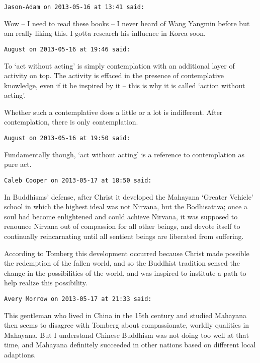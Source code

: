\begin{footnotesize}\begin{sffamily}

\texttt{Jason-Adam on 2013-05-16 at 13:41 said: }

Wow – I need to read these books – I never heard of Wang Yangmin before but am really liking this. I gotta research his influence in Korea soon.

\hfill

\texttt{August on 2013-05-16 at 19:46 said: }

To `act without acting’ is simply contemplation with an additional layer of activity on top. The activity is effaced in the presence of contemplative knowledge, even if it be inspired by it – this is why it is called `action without acting’.

Whether such a contemplative does a little or a lot is indifferent. After contemplation, there is only contemplation.


\hfill

\texttt{August on 2013-05-16 at 19:50 said: }

Fundamentally though, `act without acting’ is a reference to contemplation as pure act.


\hfill

\texttt{Caleb Cooper on 2013-05-17 at 18:50 said: }

In Buddhisms' defense, after Christ it developed the Mahayana `Greater Vehicle' school in which the highest ideal was not Nirvana, but the Bodhisattva; once a soul had become enlightened and could achieve Nirvana, it was supposed to renounce Nirvana out of compassion for all other beings, and devote itself to continually reincarnating until all sentient beings are liberated from suffering. 

According to Tomberg this development occurred because Christ made possible the redemption of the fallen world, and so the Buddhist tradition sensed the change in the possibilities of the world, and was inspired to institute a path to help realize this possibility.


\hfill

\texttt{Avery Morrow on 2013-05-17 at 21:33 said: }

This gentleman who lived in China in the 15th century and studied Mahayana then seems to disagree with Tomberg about compassionate, worldly qualities in Mahayana. But I understand Chinese Buddhism was not doing too well at that time, and Mahayana definitely succeeded in other nations based on different local adaptions.



\end{sffamily}
\end{footnotesize}
